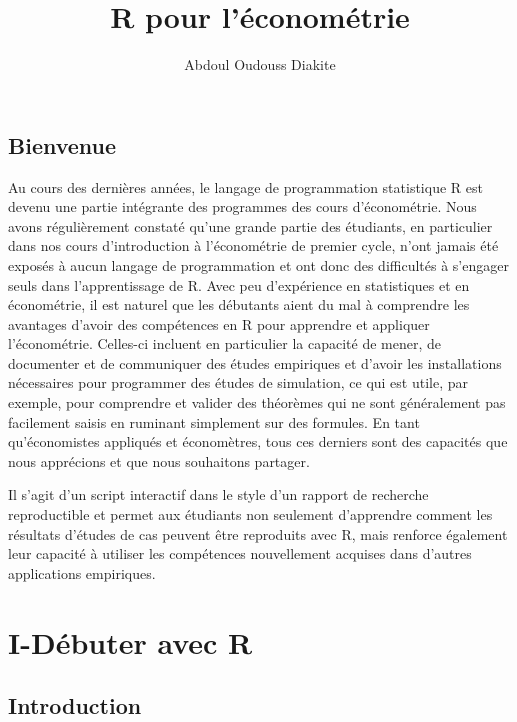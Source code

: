 \documentclass[
]{book}
\title{R pour l'économétrie}
\author{Abdoul Oudouss Diakite}
\date{}
\begin{document}
\maketitle

{
\setcounter{tocdepth}{1}
\tableofcontents
}
\hypertarget{bienvenue}{%
\chapter*{Bienvenue}\label{bienvenue}}

Au cours des dernières années, le langage de programmation statistique R est devenu une partie intégrante des programmes des cours d'économétrie. Nous avons régulièrement constaté qu'une grande partie des étudiants, en particulier dans nos cours d'introduction à l'économétrie de premier cycle, n'ont jamais été exposés à aucun langage de programmation et ont donc des difficultés à s'engager seuls dans l'apprentissage de R. Avec peu d'expérience en statistiques et en économétrie, il est naturel que les débutants aient du mal à comprendre les avantages d'avoir des compétences en R pour apprendre et appliquer l'économétrie. Celles-ci incluent en particulier la capacité de mener, de documenter et de communiquer des études empiriques et d'avoir les installations nécessaires pour programmer des études de simulation, ce qui est utile, par exemple, pour comprendre et valider des théorèmes qui ne sont généralement pas facilement saisis en ruminant simplement sur des formules. En tant qu'économistes appliqués et économètres, tous ces derniers sont des capacités que nous apprécions et que nous souhaitons partager.

Il s'agit d'un script interactif dans le style d'un rapport de recherche reproductible et permet aux étudiants non seulement d'apprendre comment les résultats d'études de cas peuvent être reproduits avec R, mais renforce également leur capacité à utiliser les compétences nouvellement acquises dans d'autres applications empiriques.

\hypertarget{part-i-duxe9buter-avec-r}{%
\part{I-Débuter avec R}\label{part-i-duxe9buter-avec-r}}

\hypertarget{intro1}{%
\chapter{Introduction}\label{intro1}}
\end{document}
